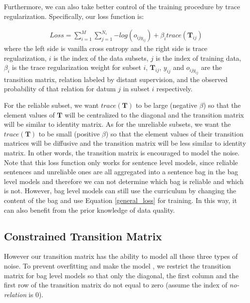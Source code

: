Furthermore, we can also take better control of the training procedure by trace regularization.
Specifically, our loss function is:

\begin{equation}
\begin{aligned}
Loss=\sum_{i=1}^M{\sum_{j=1}^{N_i}{-log(o_{ijy_{ij}})}} + \beta_i trace(\mathbf{T}_{ij})
\end{aligned}
\end{equation}
where the left side is vanilla cross entropy and the right side is trace regularization, $i$ is the index of the data subsets, $j$ is the index of training data, $\beta_i$ is the trace regularization weight for subset $i$, $\mathbf{T}_{ij}$, $y_{ij}$ and $o_{ijy_{ij}}$ are the transition matrix, relation labeled by distant supervision, and the observed probability of that relation for datum $j$ in subset $i$ respectively.

For the reliable subset, we want $trace(\mathbf{T})$ to be large (negative $\beta$) so that the element values of $\mathbf{T}$ will be centralized to the diagonal and the transition matrix will be similar to identity matrix. As for the unreliable subsets, we want the $trace(\mathbf{T})$ to be small (positive $\beta$) so that the element values of their transition matrices will be diffusive and the transition matrix will be less similar to identity matrix. In other words, the transition matrix is encouraged to model the noise. Note that this loss function only works for sentence level models, since reliable sentences and unreliable ones are all aggregated into a sentence bag in the bag level models and therefore we can not determine which bag is reliable and which is not. However, bag level models can still use the curriculum by changing the content of the bag and use Equation \ref{general_loss} for training. In this way, it can also benefit from the prior knowledge of data quality.



\subsection{Constrained Transition Matrix}
 However our transition matrix has the ability to model all these three types of noise. To prevent overfitting and make the model , we restrict the transition matrix for bag level models so that only the diagonal, the first column and the first row of the transition matrix do not equal to zero (assume the index of \emph{no-relation} is 0).
